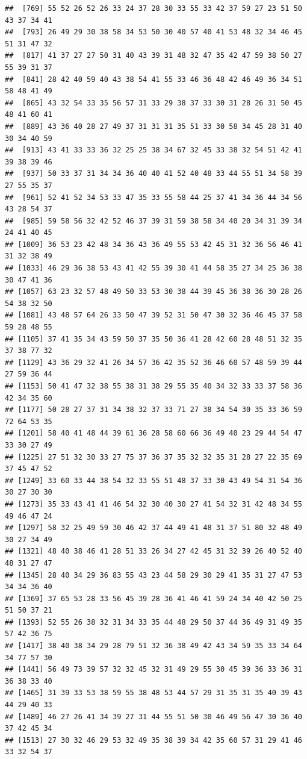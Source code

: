 \documentclass[
]{book}
\begin{document}
\begin{verbatim}
##  [769] 55 52 26 52 26 33 24 37 28 30 33 55 33 42 37 59 27 23 51 50 43 37 34 41
##  [793] 26 49 29 30 38 58 34 53 50 30 40 57 40 41 53 48 32 34 46 45 51 31 47 32
##  [817] 41 37 27 27 50 31 40 43 39 31 48 32 47 35 42 47 59 38 50 27 55 39 31 37
##  [841] 28 42 40 59 40 43 38 54 41 55 33 46 36 48 42 46 49 36 34 51 58 48 41 49
##  [865] 43 32 54 33 35 56 57 31 33 29 38 37 33 30 31 28 26 31 50 45 48 41 60 41
##  [889] 43 36 40 28 27 49 37 31 31 31 35 51 33 30 58 34 45 28 31 40 30 34 40 59
##  [913] 43 41 33 33 36 32 25 25 38 34 67 32 45 33 38 32 54 51 42 41 39 38 39 46
##  [937] 50 33 37 31 34 34 36 40 40 41 52 40 48 33 44 55 51 34 58 39 27 55 35 37
##  [961] 52 41 52 34 53 33 47 35 33 55 58 44 25 37 41 34 36 44 34 56 43 28 54 37
##  [985] 59 58 56 32 42 52 46 37 39 31 59 38 58 34 40 20 34 31 39 34 24 41 40 45
## [1009] 36 53 23 42 48 34 36 43 36 49 55 53 42 45 31 32 36 56 46 41 31 32 38 49
## [1033] 46 29 36 38 53 43 41 42 55 39 30 41 44 58 35 27 34 25 36 38 30 47 41 36
## [1057] 63 23 32 57 48 49 50 33 53 30 38 44 39 45 36 38 36 30 28 26 54 38 32 50
## [1081] 43 48 57 64 26 33 50 47 39 52 31 50 47 30 32 36 46 45 37 58 59 28 48 55
## [1105] 37 41 35 34 43 59 50 37 35 50 36 41 28 42 60 28 48 51 32 35 37 38 77 32
## [1129] 43 36 29 32 41 26 34 57 36 42 35 52 36 46 60 57 48 59 39 44 27 59 36 44
## [1153] 50 41 47 32 38 55 38 31 38 29 55 35 40 34 32 33 33 37 58 36 42 34 35 60
## [1177] 50 28 27 37 31 34 38 32 37 33 71 27 38 34 54 30 35 33 36 59 72 64 53 35
## [1201] 58 40 41 48 44 39 61 36 28 58 60 66 36 49 40 23 29 44 54 47 33 30 27 49
## [1225] 27 51 32 30 33 27 75 37 36 37 35 32 32 35 31 28 27 22 35 69 37 45 47 52
## [1249] 33 60 33 44 38 54 32 33 55 51 48 37 33 30 43 49 54 31 54 36 30 27 30 30
## [1273] 35 33 43 41 41 46 54 32 30 40 30 27 41 54 32 31 42 48 34 55 49 46 47 24
## [1297] 58 32 25 49 59 30 46 42 37 44 49 41 48 31 37 51 80 32 48 49 30 27 34 49
## [1321] 48 40 38 46 41 28 51 33 26 34 27 42 45 31 32 39 26 40 52 40 48 31 27 47
## [1345] 28 40 34 29 36 83 55 43 23 44 58 29 30 29 41 35 31 27 47 53 34 34 36 40
## [1369] 37 65 53 28 33 56 45 39 28 36 41 46 41 59 24 34 40 42 50 25 51 50 37 21
## [1393] 52 55 26 38 32 31 34 33 35 44 48 29 50 37 44 36 49 31 49 35 57 42 36 75
## [1417] 38 40 38 34 29 28 79 51 32 36 38 49 42 43 34 59 35 33 34 64 34 77 57 30
## [1441] 56 49 73 39 57 32 32 45 32 31 49 29 55 30 45 39 36 33 36 31 36 38 33 40
## [1465] 31 39 33 53 38 59 55 38 48 53 44 57 29 31 35 31 35 40 39 43 44 29 40 33
## [1489] 46 27 26 41 34 39 27 31 44 55 51 50 30 46 49 56 47 30 36 40 37 42 45 34
## [1513] 27 30 32 46 29 53 32 49 35 38 39 34 42 35 60 57 31 29 41 46 33 32 54 37

\end{verbatim}
\end{document}
